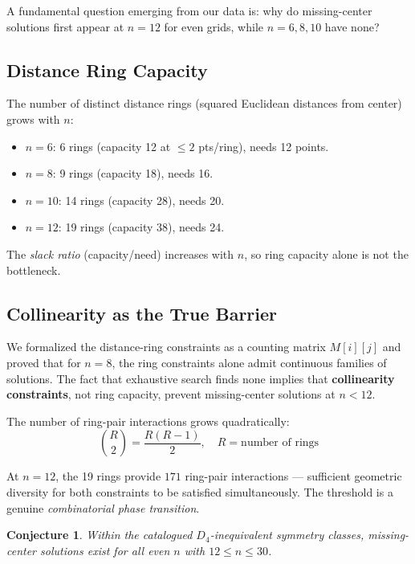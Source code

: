 \documentclass[11pt,a4paper]{article}
\theoremstyle{plain}
\newtheorem{conjecture}[theorem]{Conjecture}
\theoremstyle{definition}
\begin{document}
A fundamental question emerging from our data is: why do missing-center solutions first appear at $n=12$ for even grids, while $n=6,8,10$ have none?

\subsection{Distance Ring Capacity}

The number of distinct distance rings (squared Euclidean distances from center) grows with $n$:
\begin{itemize}
\item $n=6$: 6 rings (capacity 12 at $\le2$ pts/ring), needs 12 points.
\item $n=8$: 9 rings (capacity 18), needs 16.
\item $n=10$: 14 rings (capacity 28), needs 20.
\item $n=12$: 19 rings (capacity 38), needs 24.
\end{itemize}

The \emph{slack ratio} (capacity/need) increases with $n$, so ring capacity alone is not the bottleneck.

\subsection{Collinearity as the True Barrier}

We formalized the distance-ring constraints as a counting matrix $M[i][j]$ and proved that for $n=8$, the ring constraints alone admit continuous families of solutions. The fact that exhaustive search finds none implies that \textbf{collinearity constraints}, not ring capacity, prevent missing-center solutions at $n<12$.

The number of ring-pair interactions grows quadratically:
\begin{equation}
\binom{R}{2} = \frac{R(R-1)}{2},\quad R = \text{number of rings}
\end{equation}

At $n=12$, the 19 rings provide $171$ ring-pair interactions --- sufficient geometric diversity for both constraints to be satisfied simultaneously. The threshold is a genuine \emph{combinatorial phase transition}.

\begin{conjecture}
Within the catalogued $D_4$-inequivalent symmetry classes, missing-center solutions exist for all even $n$ with $12\le n\le 30$.
\end{conjecture}
\end{document}
